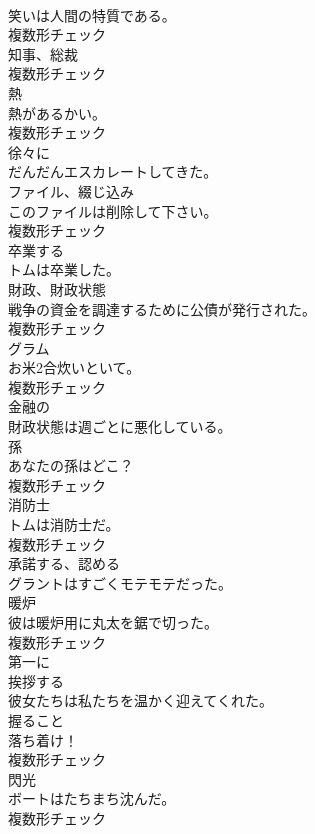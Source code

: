 \documentclass[8pt]{extreport}
\begin{document}
\begin{CJK}{UTF8}{min}
\\	笑いは人間の特質である。	
\\	複数形チェック
\\	[名詞]	知事、総裁	
\\	複数形チェック
\\	[名詞]	熱	
\\	熱があるかい。	
\\	複数形チェック
\\	[副詞]	徐々に	
\\	だんだんエスカレートしてきた。	
\\	[名詞]	ファイル、綴じ込み	
\\	このファイルは削除して下さい。	
\\	複数形チェック
\\	[動詞]	卒業する	
\\	トムは卒業した。	
\\	[名詞]	財政、財政状態	
\\	戦争の資金を調達するために公債が発行された。	
\\	複数形チェック
\\	[名詞]	グラム	
\\	お米2合炊いといて。	
\\	複数形チェック
\\	[形容詞]	金融の	
\\	財政状態は週ごとに悪化している。	
\\	[名詞]	孫	
\\	あなたの孫はどこ？	
\\	複数形チェック
\\	[名詞]	消防士	
\\	トムは消防士だ。	
\\	複数形チェック
\\	[動詞]	承諾する、認める	
\\	グラントはすごくモテモテだった。	
\\	[名詞]	暖炉	
\\	彼は暖炉用に丸太を鋸で切った。	
\\	複数形チェック
\\	[副詞]	第一に	
\\	[動詞]	挨拶する	
\\	彼女たちは私たちを温かく迎えてくれた。	
\\	[名詞]	握ること	
\\	落ち着け！	
\\	複数形チェック
\\	[名詞]	閃光	
\\	ボートはたちまち沈んだ。	
\\	複数形チェック

\end{CJK}
\end{document}

